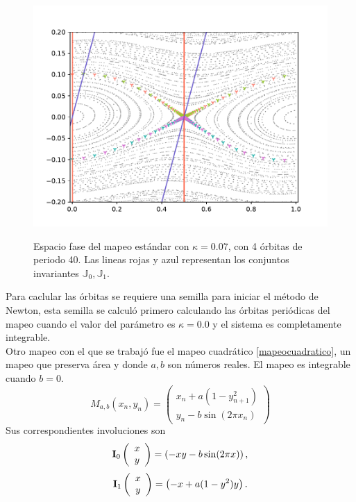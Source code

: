 \begin{figure}[H]
	\centering
	\includegraphics[scale= 0.7]{EstandarOP1-40.pdf}
	\label{orbitasp40estandar}
	\caption{Espacio fase del mapeo est\'andar con $\kappa = 0.07$, con 4  \'orbitas de periodo 40. Las lineas rojas y azul representan los conjuntos invariantes $\mathbb{J}_{0},\mathbb{J}_{1}$.}
\end{figure}

Para caclular las \'orbitas se requiere una semilla para iniciar el m\'etodo de Newton, esta semilla se calcul\'o primero calculando las \'orbitas peri\'odicas del mapeo cuando el valor del par\'ametro es $\kappa=0.0$ y el sistema es completamente integrable. \\ 

Otro mapeo con el que se trabaj\'o fue el mapeo cuadr\'atico \eqref{mapeocuadratico}, un mapeo que preserva \'area y donde $a,b$ son n\'umeros reales. El mapeo es integrable cuando $b=0$.
\begin{equation}
	M_{a,b}(x_{n},y_{n}) = \left(
	\begin{array}{c}
	x_{n}+a(1-y_{n+1}^{2})\\
	y_{n}-b\sin(2\pi x_{n})
	\end{array}
	\right)
	\label{mapeocuadratico}
\end{equation}
Sus correspondientes involuciones son
\begin{equation}
	\mathbf{I}_{0}
	\left(\begin{array}{c}
		x\\
		y
	\end{array}
	\right) = 
	\left(-x\\
	y-b\sin(2\pi x)
	\right),
	\label{involucioncuadratico0}
\end{equation}
\begin{equation}
	\mathbf{I}_{1}
	\left(\begin{array}{c}
		x\\
		y
	\end{array}
	\right) = 
	\left(-x+ a(1-y^{2})\\
	y
	\right).
	\label{involucioncuadratico1}
\end{equation}

